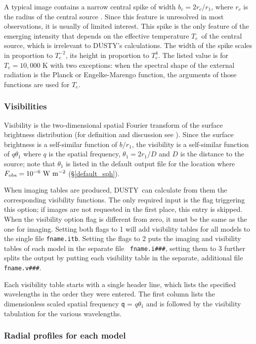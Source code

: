 \documentclass[11pt]{article}
\def\D  {{\sf DUSTY}}
\def\E#1{\hbox{$10^{#1}$}}
\def\Te   {\hbox{$T_e$}}
\begin{document}
A typical image contains a narrow central spike of width $b_c = 2r_c/r_1$,
where $r_c$ is the radius of the central source \cite{IE96a}.  Since this
feature is unresolved in most observations, it is usually of limited interest.
This spike is the only feature of the emerging intensity that depends on the
effective temperature \Te\ of the central source, which is irrelevant to \D's
calculations. The width of the spike scales in proportion to $T_e^{-2}$, its
height in proportion to $T_e^4$. The listed value is for $T_e = 10,000$ K with
two exceptions: when the spectral shape of the external radiation is the Planck
or Engelke-Marengo function, the arguments of those functions are used for
$T_e$.

\subsubsection{Visibilities}
\label{fname.v}

Visibility is the two-dimensional spatial Fourier transform of the surface
brightness distribution (for definition and discussion see \cite{IE96a}). Since
the surface brightness is a self-similar function of $b/r_1$, the visibility is
a self-similar function of $q\theta_1$ where $q$ is the spatial frequency,
$\theta_1 = 2r_1/D$ and $D$ is the distance to the source; note that $\theta_1$
is listed in the default output file for the location where $F_{\rm obs} =
\E{-6}\ \rm W\ m^{-2}$ (\S\ref{default_sph}).

When imaging tables are produced, \D\ can calculate from them the corresponding
visibility functions. The only required input is the flag triggering this
option; if images are not requested in the first place, this entry is skipped.
When the visibility option flag is different from zero, it must be the same as
the one for imaging. Setting both flags to 1 will add visibility tables for all
models to the single file {\tt fname.itb}. Setting the flags to 2 puts the
imaging and visibility tables of each model in the separate file {\tt
fname.i\#\#\#}, setting them to 3 further splits the output by putting each
visibility table in the separate, additional file {\tt fname.v\#\#\#}.

Each visibility table starts with a single header line, which lists the
specified wavelengths in the order they were entered. The first column lists
the dimensionless scaled spatial frequency {\tt q} = $q\theta_1$ and is
followed by the visibility tabulation for the various wavelengths.


\subsubsection{Radial profiles for each model}
\label{fname.r}
\end{document}
